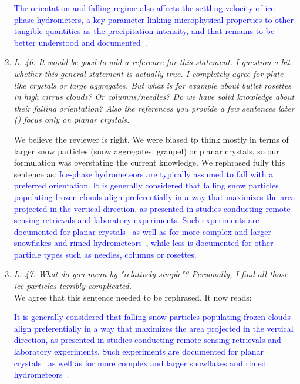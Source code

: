 \documentclass[12pt]{article}
\newcommand*{\blue}{\textcolor{blue}}
\begin{document}
\begin{enumerate}
    \blue{The orientation and falling regime also affects the settling velocity of ice phase hydrometers, a key parameter linking microphysical properties to other tangible quantities as the precipitation intensity, and that remains to be better understood and documented~\cite{Heymsfield_JAS_2004}.}\\

    \item \textit{L. 46: It would be good to add a reference for this statement. I question a bit whether this general statement is actually true. I completely agree for plate-like crystals or large aggregates. But what is for example about bullet rosettes in high cirrus clouds? Or columns/needles? Do we have solid knowledge about their falling orientation? Also the references you provide a few sentences later (\cite{Noel_JAMC_2005,Tinklenberg_JFM_2023}) focus only on planar crystals.}

    We believe the reviewer is right. We were biased tp think mostly in terms of larger snow particles (snow aggregates, graupel) or planar crystals, so our formulation was overstating the current knowledge. We rephrased fully this sentence as:
    \blue{Ice-phase hydrometeors are typically assumed to fall with a preferred orientation. It is generally considered that falling snow particles populating frozen clouds align preferentially in a way that maximizes the area projected in the vertical direction, as presented in studies conducting remote sensing retrievals and laboratory experiments. Such experiments are documented for planar crystals~\cite{Noel_JAMC_2005,Matrosov_JAS_2005,Tinklenberg_JFM_2024} as well as for more complex and larger snowflakes and rimed hydrometeors~\cite{Kennedy_JAMC_2011, Ryzhkov_JAMC_2011, Koebschall_EF_2023}, while less is documented for other particle types such as needles, columns or rosettes. }\\


    \item \textit{L. 47: What do you mean by "relatively simple"? Personally, I find all those ice particles terribly complicated.}\\
    
    We agree that this sentence needed to be rephrased. It now reads:
    
    \blue{ It is generally considered that falling snow particles populating frozen clouds align preferentially in a way that maximizes the area projected in the vertical direction, as presented in studies conducting remote sensing retrievals and laboratory experiments. Such experiments are documented for planar crystals~\cite{Noel_JAMC_2005,Matrosov_JAS_2005,Tinklenberg_JFM_2024} as well as for more complex and larger snowflakes and rimed hydrometeors~\cite{Kennedy_JAMC_2011, Ryzhkov_JAMC_2011, Koebschall_EF_2023}. }\\
    

\end{enumerate}
\end{document}
